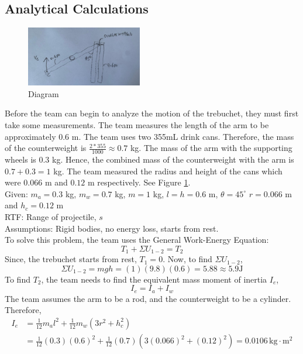 \documentclass[12pt, titlepage]{article}
\begin{document}
    \subsection{Analytical Calculations}
    \begin{figure}[b]                                  
    \centering
    \includegraphics[width=0.45\textwidth]{figures/d1.jpeg}
    \caption{Diagram\label{d1}}
    \end{figure}
    Before the team can begin to analyze the motion of the trebuchet, they must
    first take some measurements. The team measures the length of the arm to be 
    approximately $0.6$ m. The team uses two 355mL drink cans.
    Therefore, the mass of the counterweight is $\frac{2*355}{1000} \approx 0.7$ kg.
    The mass of the arm with the supporting wheels is $0.3$ kg.
    Hence, the combined mass of the counterweight with the arm is 
    $0.7 + 0.3 = 1$ kg. The team measured the radius
    and height of the cans which were $0.066$ m and $0.12$ m respectively. See Figure \ref{d1}.\\[20pt]
    Given: $m_{a} = 0.3$ kg, $m_{w} = 0.7$ kg, $m = 1$ kg, $l = h = 0.6$ m, $\theta = 45^\circ$
    $r = 0.066$ m and $h_c = 0.12$ m\\
    RTF: Range of projectile, $s$\\
    Assumptions: Rigid bodies, no energy loss, starts from rest.\\[10pt]
    To solve this problem, the team uses the General Work-Energy Equation:
    $$T_1 + \Sigma U_{1-2} = T_2$$
    Since, the trebuchet starts from rest, $T_1 = 0$. Now, to find $\Sigma U_{1-2}$,
    $$\Sigma U_{1-2} = mgh = (1)(9.8)(0.6) = 5.88 \approx 5.9 \mathrm{J}$$
    To find $T_2$, the team needs to find the equivalent mass moment of inertia $I_e$,
    $$I_e = I_a + I_w$$
    \newpage
    \noindent The team assumes the arm to be a rod, and the counterweight to be a cylinder. Therefore,
    \begin{align*}
        I_e &= \frac{1}{12}m_al^2 + \frac{1}{12}m_w(3r^2 + h_c^2) \\
        &= \frac{1}{12}(0.3)(0.6)^2 + \frac{1}{12}(0.7)\left(3(0.066)^2 + (0.12)^2\right) = 0.0106 \, \mathrm{kg} \cdot \mathrm{m}^2
    \end{align*}
\end{document}
